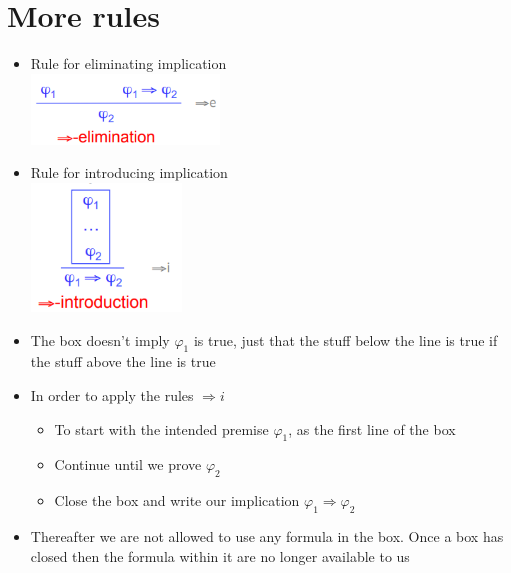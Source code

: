 \documentclass{article}[18pt]
\begin{document}
\section{More rules}
\begin{itemize}
\item Rule for eliminating implication\\
\includegraphics[width=5cm]{Fig3.png}
\item Rule for introducing implication\\
\includegraphics[width=4cm]{Fig4.png}
\item The box doesn't imply $\varphi_1$ is true, just that the stuff below the line is true if the stuff above the line is true
\item In order to apply the rules $\Rightarrow i$
\begin{itemize}
\item To start with the intended premise $\varphi_1$, as the first line of the box
\item Continue until we prove $\varphi_2$
\item Close the box and write our implication $\varphi_1\Rightarrow\varphi_2$
\end{itemize}
\item Thereafter we are not allowed to use any formula in the box. Once a box has closed then the formula within it are no longer available to us
\end{itemize}
\end{document}
